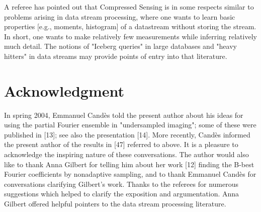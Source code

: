 \documentclass[10pt]{article}
\begin{document}
A referee has pointed out that Compressed Sensing is in some respects similar to problems arising in data stream processing, where one wants to learn basic properties [e.g., moments, histogram] of a datastream without storing the stream. In short, one wants to make relatively few measurements while inferring relatively much detail. The notions of "Iceberg queries" in large databases and "heavy hitters" in data streams may provide points of entry into that literature.

\section*{Acknowledgment}
In spring 2004, Emmanuel Candès told the present author about his ideas for using the partial Fourier ensemble in "undersampled imaging"; some of these were published in [13]; see also the presentation [14]. More recently, Candès informed the present author of the results in [47] referred to above. It is a pleasure to acknowledge the inspiring nature of these conversations. The author would also like to thank Anna Gilbert for telling him about her work [12] finding the B-best Fourier coefficients by nonadaptive sampling, and to thank Emmanuel Candès for conversations clarifying Gilbert's work. Thanks to the referees for numerous suggestions which helped to clarify the exposition and argumentation. Anna Gilbert offered helpful pointers to the data stream processing literature.
\end{document}

